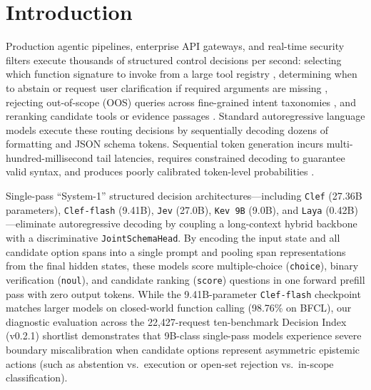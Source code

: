 \documentclass[10pt,twocolumn]{article}
\begin{document}
\section{Introduction}
Production agentic pipelines, enterprise API gateways, and real-time security filters execute thousands of structured control decisions per second: selecting which function signature to invoke from a large tool registry \citep{patil2024gorilla,li2023apibank}, determining when to abstain or request user clarification if required arguments are missing \citep{ross2025when2call}, rejecting out-of-scope (OOS) queries across fine-grained intent taxonomies \citep{larson2019clinc150,casanueva2020banking77}, and reranking candidate tools or evidence passages \citep{shi2025toolret,su2025bright,reddy2022esci}. Standard autoregressive language models execute these routing decisions by sequentially decoding dozens of formatting and JSON schema tokens. Sequential token generation incurs multi-hundred-millisecond tail latencies, requires constrained decoding to guarantee valid syntax, and produces poorly calibrated token-level probabilities \citep{guo2017calibration}.

Single-pass ``System-1'' structured decision architectures---including \texttt{Clef} (27.36B parameters), \texttt{Clef-flash} (9.41B), \texttt{Jev} (27.0B), \texttt{Kev 9B} (9.0B), and \texttt{Laya} (0.42B) \citep{cloudflare2026clef,apolinario2026decisionindex}---eliminate autoregressive decoding by coupling a long-context hybrid backbone \citep{yang2024deltanet,yang2025gateddeltanet} with a discriminative \texttt{JointSchemaHead}. By encoding the input state and all candidate option spans into a single prompt and pooling span representations from the final hidden states, these models score multiple-choice (\texttt{choice}), binary verification (\texttt{noul}), and candidate ranking (\texttt{score}) questions in one forward prefill pass with zero output tokens. While the 9.41B-parameter \texttt{Clef-flash} checkpoint matches larger models on closed-world function calling (98.76\% on BFCL), our diagnostic evaluation across the 22,427-request ten-benchmark Decision Index (v0.2.1) shortlist \citep{apolinario2026decisionindex} demonstrates that 9B-class single-pass models experience severe boundary miscalibration when candidate options represent asymmetric epistemic actions (such as abstention vs.\ execution or open-set rejection vs.\ in-scope classification).
\end{document}

